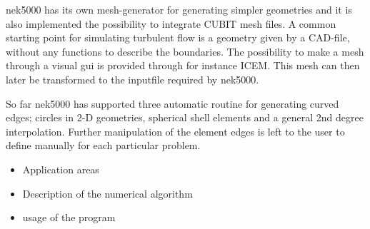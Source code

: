 nek5000 has its own mesh-generator for generating simpler geometries and it is also implemented the possibility to integrate CUBIT mesh 
files. A common starting point for simulating turbulent flow is a geometry given by a CAD-file, without any functions to describe the 
boundaries. The possibility to make a mesh through a visual gui is provided through for instance ICEM. This mesh can then later be transformed
to the inputfile required by nek5000. 

So far nek5000 has supported three automatic routine for generating curved edges; circles in 2-D geometries, spherical shell elements and 
a general 2nd degree interpolation. Further manipulation of the element edges is left to the user to define manually for each particular 
problem. 

\begin{itemize}
\item Application areas
\item Description of the numerical algorithm 
\item usage of the program 
\end{itemize}

